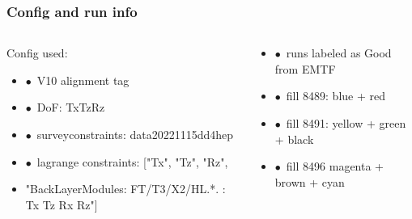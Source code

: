 \documentclass[aspectratio=1610, 12pt]{beamer}
\begin{document}
\begin{frame}\frametitle{Config and run info}
  \begin{columns}
    \begin{column}[c]{0.48\textwidth}
      Config used:
      \begin{itemize}
        \item $\bullet$\, V10 alignment tag
        \item $\bullet$\, DoF: TxTzRz
        \item $\bullet$\, surveyconstraints: data20221115dd4hep
        \item $\bullet$\, lagrange constraints: ["Tx", "Tz", "Rz",
        \item "BackLayerModules: FT/T3/X2/HL.*. : Tx Tz Rx Rz"]
      \end{itemize}
    \end{column}
    \begin{column}[c]{0.48\textwidth}
      \begin{itemize}
        \item $\bullet$\, runs labeled as Good from EMTF
        \item $\bullet$\, fill 8489: blue + red
        \item $\bullet$\, fill 8491: yellow + green + black
        \item $\bullet$\, fill 8496 magenta + brown + cyan
      \end{itemize}
    \end{column}
  \end{columns}
\end{frame}
\end{document}
